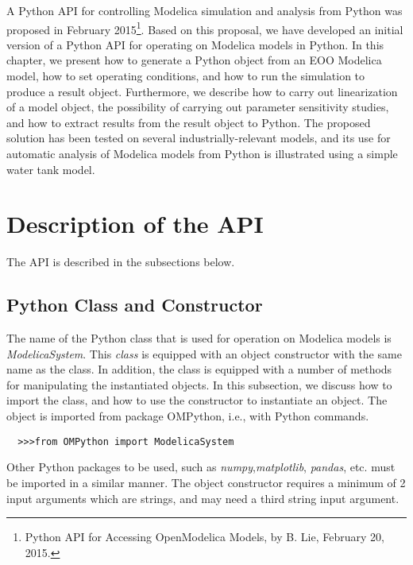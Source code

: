 A Python API for controlling Modelica simulation and analysis from Python was proposed in February 2015\footnote{Python API for Accessing OpenModelica Models, by B. Lie, February 20, 2015.}. Based on this proposal, we have developed an initial version of a Python API for operating on Modelica models in Python. In this chapter, we present how to generate a Python object from an EOO Modelica model, how to set operating conditions, and how to run the simulation to produce a result object. Furthermore, we describe how to carry out linearization of a model object, the possibility of carrying out parameter sensitivity studies, and how to extract results from the result object to Python. The proposed solution has been tested on several industrially-relevant models, and its use for automatic analysis of Modelica models from Python is illustrated using a simple water tank model.

\section{Description of the API}
\label{sec:pythonapi}

The API is described in the subsections below.

\subsection{Python Class and Constructor}
\label{subsec:pythonclass}

The name of the Python class that is used for operation on Modelica models is \textit{ModelicaSystem}.
This \textit{class} is equipped with an object constructor with the same name as the class. In addition, the class is equipped
with a number of methods for manipulating the instantiated objects. In this subsection, we discuss how to import the class, and
how to use the constructor to instantiate an object. The object is imported from package OMPython, i.e., with
Python commands.

\begin{lstlisting}
  >>>from OMPython import ModelicaSystem
\end{lstlisting}

Other Python packages to be used, such as \textit{numpy},\textit{matplotlib}, \textit{pandas}, etc. must be imported in a similar
manner. The object constructor requires a minimum of 2 input arguments which are strings, and may need a third string input
argument.

